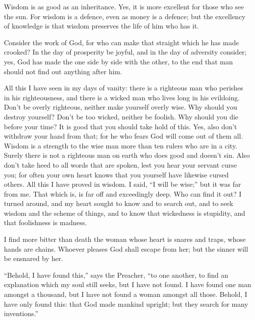  Wisdom is as good as an inheritance. Yes, it is more
excellent for those who see the sun.  For wisdom is a
defence, even as money is a defence; but the excellency of knowledge is
that wisdom preserves the life of him who has it.

 Consider the work of God, for who can make that straight
which he has made crooked?  In the day of prosperity be
joyful, and in the day of adversity consider; yes, God has made the one
side by side with the other, to the end that man should not find out
anything after him.

 All this I have seen in my days of vanity: there is a
righteous man who perishes in his righteousness, and there is a wicked
man who lives long in his evildoing.  Don't be overly
righteous, neither make yourself overly wise. Why should you destroy
yourself?  Don't be too wicked, neither be foolish. Why
should you die before your time?  It is good that you
should take hold of this. Yes, also don't withdraw your hand from that;
for he who fears God will come out of them all.  Wisdom
is a strength to the wise man more than ten rulers who are in a city.
 Surely there is not a righteous man on earth who does
good and doesn't sin.  Also don't take heed to all words
that are spoken, lest you hear your servant curse you; 
for often your own heart knows that you yourself have likewise cursed
others.  All this I have proved in wisdom. I said, ``I
will be wise;'' but it was far from me.  That which is,
is far off and exceedingly deep. Who can find it out?  I
turned around, and my heart sought to know and to search out, and to
seek wisdom and the scheme of things, and to know that wickedness is
stupidity, and that foolishness is madness.

 I find more bitter than death the woman whose heart is
snares and traps, whose hands are chains. Whoever pleases God shall
escape from her; but the sinner will be ensnared by her.

 ``Behold, I have found this,'' says the Preacher, ``to
one another, to find an explanation  which my soul still
seeks, but I have not found. I have found one man amongst a thousand,
but I have not found a woman amongst all those.  Behold,
I have only found this: that God made mankind upright; but they search
for many inventions.''

